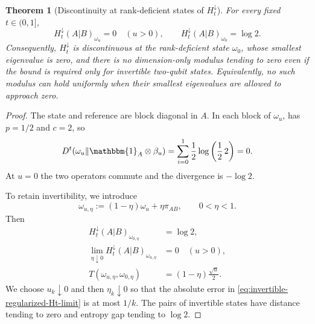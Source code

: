 \documentclass[11pt]{article}
\newtheorem{theorem}[theorem]{Theorem}
\theoremstyle{remark}
\newcommand{\1}{\mathbbm{1}}
\begin{document}
\begin{theorem}[Discontinuity at rank-deficient states of
$H_t^\downarrow$]
\label{theo:Ht-down-discontinuous}
For every fixed $t\in(0,1]$,
\begin{equation}
 H_t^\downarrow(A|B)_{\omega_u}=0\quad(u>0),
 \qquad
 H_t^\downarrow(A|B)_{\omega_0}=\log2.
 \label{eq:Ht-down-discontinuity-values}
\end{equation}
Consequently, $H_t^\downarrow$ is discontinuous at the
rank-deficient state $\omega_0$, whose smallest eigenvalue is zero,
and there is no dimension-only modulus tending to zero even if the
bound is required only for invertible two-qubit states.  Equivalently,
no such modulus can hold uniformly when their smallest eigenvalues are
allowed to approach zero.
\end{theorem}

\begin{proof}
The state and reference are block diagonal in $A$.  In each block of
$\omega_u$,  has $p=1/2$
and $c=2$, so
\begin{equation}
 D^t(\omega_u\Vert\1_A\otimes\beta_u)
 =\sum_{i=0}^1\frac12\log\left(\frac12\,2\right)=0.
\end{equation}
At $u=0$ the two operators commute and the divergence is $-\log2$.

To retain invertibility, we introduce
\begin{equation}
 \omega_{u,\eta}:=(1-\eta)\omega_u+\eta\pi_{AB},
 \qquad 0<\eta<1.
 \label{eq:invertible-regularization-omega}
\end{equation}
Then
\begin{align}
 H_t^\downarrow(A|B)_{\omega_{0,\eta}}&=\log2,
 \label{eq:invertible-anchor-product}\\
 \lim_{\eta\downarrow0}
 H_t^\downarrow(A|B)_{\omega_{u,\eta}}&=0
 \quad(u>0),
 \label{eq:invertible-regularized-Ht-limit}\\
 T(\omega_{u,\eta},\omega_{0,\eta})
 &=(1-\eta)\frac{\sqrt u}{2}.
 \label{eq:invertible-regularized-distance}
\end{align}
We choose $u_k\downarrow0$ and then $\eta_k\downarrow0$ so that the
absolute error in \eqref{eq:invertible-regularized-Ht-limit} is at most
$1/k$.  The pairs of invertible states have distance tending to zero and
entropy gap tending to $\log2$.
\end{proof}
\end{document}
